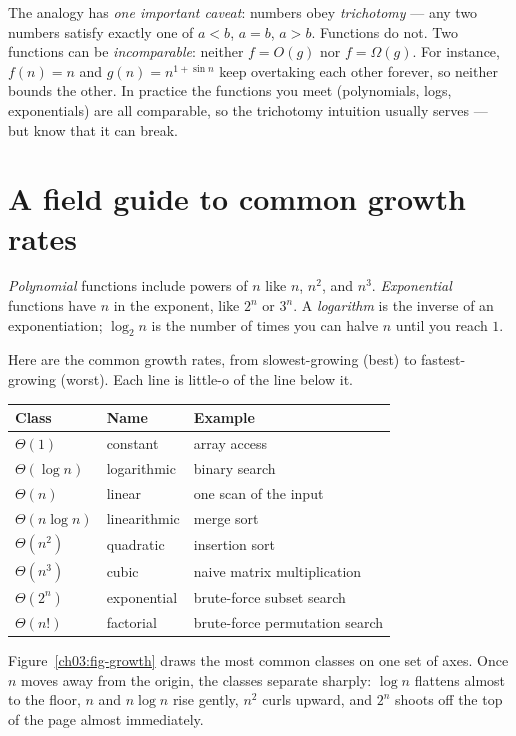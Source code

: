 \begin{trapbox}
The analogy has \emph{one important caveat}: numbers obey \emph{trichotomy} --- any two
numbers satisfy exactly one of $a<b$, $a=b$, $a>b$. Functions do not. Two functions can
be \emph{incomparable}: neither $f = O(g)$ nor $f = \Omega(g)$. For instance,
$f(n) = n$ and $g(n) = n^{1 + \sin n}$ keep overtaking each other forever, so neither
bounds the other. In practice the functions you meet (polynomials, logs, exponentials)
are all comparable, so the trichotomy intuition usually serves --- but know that it can
break.
\end{trapbox}

\section{A field guide to common growth rates}

\emph{Polynomial} functions include powers of $n$ like $n$, $n^2$, and $n^3$. \emph{Exponential} functions have $n$ in the exponent, like $2^n$ or $3^n$. A \emph{logarithm} is the inverse of an exponentiation; $\log_2 n$ is the number of times you can halve $n$ until you reach $1$.

Here are the common growth rates, from slowest-growing (best) to fastest-growing (worst). Each line is little-o of the line below it.

\begin{center}
\begin{tabular}{lll}
\toprule
Class & Name & Example \\
\midrule
$\Theta(1)$        & constant      & array access \\
$\Theta(\log n)$   & logarithmic   & binary search \\
$\Theta(n)$        & linear        & one scan of the input \\
$\Theta(n\log n)$  & linearithmic  & merge sort \\
$\Theta(n^2)$      & quadratic     & insertion sort \\
$\Theta(n^3)$      & cubic         & naive matrix multiplication \\
$\Theta(2^n)$      & exponential   & brute-force subset search \\
$\Theta(n!)$       & factorial     & brute-force permutation search \\
\bottomrule
\end{tabular}
\end{center}

Figure~\ref{ch03:fig-growth} draws the most common classes on one set of axes. Once $n$
moves away from the origin, the classes separate sharply:
$\log n$ flattens almost to the floor, $n$ and $n\log n$ rise gently, $n^2$ curls upward,
and $2^n$ shoots off the top of the page almost immediately.

